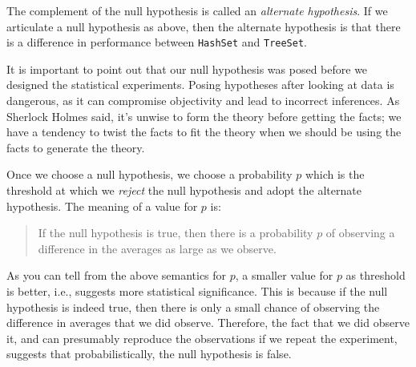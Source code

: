 The complement of the null hypothesis is called an
\emph{alternate hypothesis}.
If we articulate a null hypothesis as above, then the alternate
hypothesis is that there is a difference in performance
between \texttt{HashSet} and \texttt{TreeSet}.

It is important to point out that our null hypothesis was posed
before we designed the statistical experiments. Posing hypotheses
after looking at data is dangerous, as it 
can compromise objectivity and lead to incorrect inferences. As
Sherlock Holmes said, it's unwise to form the theory before getting the facts;
we have a tendency to twist the facts to fit the theory when we should
be using the facts to generate the theory.

Once we choose a null hypothesis,
we choose a probability $p$ which is the threshold at which
we \emph{reject} the null hypothesis and adopt the alternate
hypothesis. The meaning of a value for $p$ is:
\begin{quote}
    If the null hypothesis is true, then
    there is a probability $p$ of observing a difference
    in the averages as large as we observe.
\end{quote}

As you can tell from the above semantics for $p$, a smaller
value for $p$ as threshold is better, i.e., suggests more
statistical significance. This is because if the null hypothesis
is indeed true, then there is only a small chance of observing
the difference in averages that we did observe. Therefore,
the fact that we did observe it, and can presumably reproduce
the observations if we repeat the experiment, suggests that
probabilistically, the null hypothesis is false.

